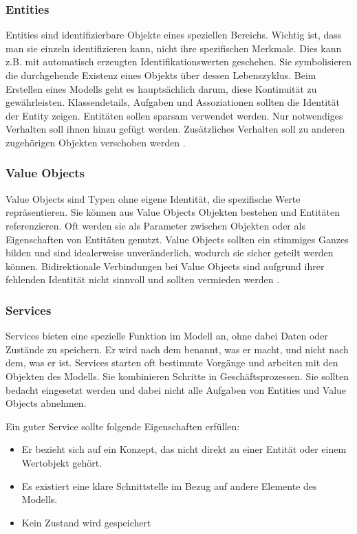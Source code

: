 {\subsubsection{Entities}

\glqq Entities\grqq{} sind identifizierbare Objekte eines speziellen Bereichs. Wichtig ist, dass man sie einzeln identifizieren kann, nicht ihre spezifischen Merkmale. Dies kann z.B. mit automatisch erzeugten Identifikationswerten geschehen. Sie symbolisieren die durchgehende Existenz eines Objekts über dessen Lebenszyklus. Beim Erstellen eines Modells geht es hauptsächlich darum, diese Kontinuität zu gewährleisten. Klassendetails, Aufgaben und Assoziationen sollten die Identität der Entity zeigen. Entitäten sollen sparsam verwendet werden. Nur notwendiges Verhalten soll ihnen hinzu gefügt werden. Zusätzliches Verhalten soll zu anderen zugehörigen Objekten verschoben werden \cite[S. 89-96]{evans} \cite[S.75]{daschner}.

\subsubsection{Value Objects}

\glqq Value Objects\grqq{} sind Typen ohne eigene Identität, die spezifische Werte repräsentieren. Sie können aus Value Objects Objekten bestehen und Entitäten referenzieren. Oft werden sie als Parameter zwischen Objekten oder als Eigenschaften von Entitäten genutzt. Value Objects sollten ein stimmiges Ganzes bilden und sind idealerweise unveränderlich, wodurch sie sicher geteilt werden können. Bidirektionale Verbindungen bei Value Objects sind aufgrund ihrer fehlenden Identität nicht sinnvoll und sollten vermieden werden \cite[S. 97-103]{evans} \cite[S.75]{daschner}.

\subsubsection{Services}

\glqq Services\grqq{} bieten eine spezielle Funktion im Modell an, ohne dabei Daten oder Zustände zu speichern. Er wird nach dem benannt, was er macht, und nicht nach dem, was er ist. Services starten oft bestimmte Vorgänge und arbeiten mit den Objekten des Modells. Sie kombinieren Schritte in Geschäftsprozessen. Sie sollten bedacht eingesetzt werden und dabei nicht alle Aufgaben von Entities und Value Objects abnehmen.

Ein guter Service sollte folgende Eigenschaften erfüllen:
\begin{itemize}
\item Er bezieht sich auf ein Konzept, das nicht direkt zu einer Entität oder einem Wertobjekt gehört.
\item Es existiert eine klare Schnittstelle im Bezug auf andere Elemente des Modells.
\item Kein Zustand wird gespeichert
\end{itemize}

}
